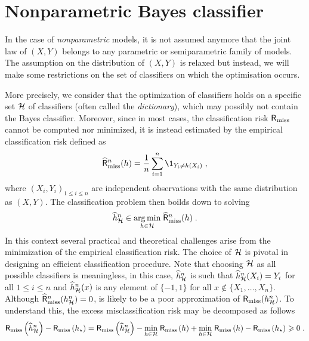 \section{Nonparametric Bayes classifier}
In the case of {\em nonparametric} models, it is not assumed anymore that the joint law of $(X,Y)$ belongs to any parametric or semiparametric family of models. The assumption on the distribution of $(X,Y)$ is relaxed but instead, we will make some restrictions on the set of classifiers on which the optimisation occurs.

More precisely, we consider that the optimization of classifiers holds on a specific set $\mathcal{H}$ of classifiers (often called the {\em dictionary}), which may possibly not contain the Bayes classifier. Moreover, since in most cases, the classification risk $\mathsf{R}_{\mathrm{miss}}$ cannot be computed nor  minimized, it is instead estimated by the empirical classification risk  defined as
\[
\widehat {\mathsf{R}}^n_{\mathrm{miss}}(h) = \frac{1}{n}\sum_{i=1}^n \1_{Y_i \neq h(X_i)}\eqsp,
\]
where  $(X_i,Y_i)_{1\leqslant i\leqslant n}$ are independent observations with the same distribution as $(X,Y)$. The classification problem then boilds down to solving
\begin{equation}
\label{eq:empirical:classif}
\widehat h^n_{\calH} \in \underset{h\in\calH}{\argmin}\;\widehat {\mathsf{R}}^n_{\mathrm{miss}}(h)\eqsp.
\end{equation}
In this context several practical and theoretical challenges arise from the minimization of the empirical classification risk. The choice of $\mathcal{H}$ is pivotal in designing an efficient classification procedure. Note that choosing $\mathcal{H}$ as all possible classifiers is meaningless, in this case, $\widehat h^n_{\mathcal{H}}$ is such that $\widehat h^n_{\mathcal{H}}(X_i) = Y_i$ for all $1 \leqslant i\leqslant n$ and $\widehat h^n_{\mathcal{H}}(x)$ is any element of $\{-1,1\}$ for all $x\notin\{X_1,\ldots,X_n\}$. Although $\widehat{\mathsf{R}}^n_{\mathrm{miss}}(h^n_{\mathcal{H}}) = 0$,  is likely to be  a poor approximation of $\mathsf{R}_{\mathrm{miss}}(h^n_{\mathcal{H}})$. To understand this, the excess misclassification risk may be decomposed as follows
\[
\mathsf{R}_{\mathrm{miss}}\left(\widehat h^n_{\mathcal{H}}\right) - \mathsf{R}_{\mathrm{miss}}\left(h_{\star}\right) = \mathsf{R}_{\mathrm{miss}}\left(\widehat h^n_{\mathcal{H}}\right) - \underset{h\in\mathcal{H}}{\min}\; \mathsf{R}_{\mathrm{miss}}\left(h\right)  + \underset{h\in\mathcal{H}}{\min}\; \mathsf{R}_{\mathrm{miss}}\left(h\right)  -  \mathsf{R}_{\mathrm{miss}}\left(h_{\star}\right) \geqslant 0\;.
\]
